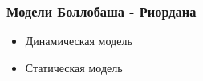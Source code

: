 \frametitle{Модели Боллобаша - Риордана}


\begin{itemize}[<+(1)->] 
    \item{Динамическая модель}     
    \item{Статическая модель}     
\end{itemize} 